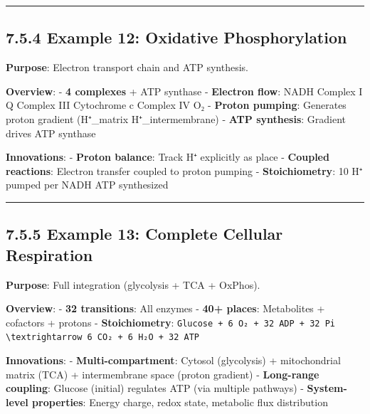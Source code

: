 \begin{center}\rule{0.5\linewidth}{0.5pt}\end{center}

\hypertarget{example-12-oxidative-phosphorylation}{%
\subsection{7.5.4 Example 12: Oxidative
Phosphorylation}\label{example-12-oxidative-phosphorylation}}

\textbf{Purpose}: Electron transport chain and ATP synthesis.

\textbf{Overview}: - \textbf{4 complexes} + ATP synthase -
\textbf{Electron flow}: NADH \textrightarrow Complex I \textrightarrow Q \textrightarrow Complex III \textrightarrow Cytochrome
c \textrightarrow Complex IV \textrightarrow O₂ - \textbf{Proton pumping}: Generates proton gradient
(H⁺\_matrix \textrightarrow H⁺\_intermembrane) - \textbf{ATP synthesis}: Gradient
drives ATP synthase

\textbf{Innovations}: - \textbf{Proton balance}: Track H⁺ explicitly as
place - \textbf{Coupled reactions}: Electron transfer coupled to proton
pumping - \textbf{Stoichiometry}: 10 H⁺ pumped per NADH  ATP
synthesized

\begin{center}\rule{0.5\linewidth}{0.5pt}\end{center}

\hypertarget{example-13-complete-cellular-respiration}{%
\subsection{7.5.5 Example 13: Complete Cellular
Respiration}\label{example-13-complete-cellular-respiration}}

\textbf{Purpose}: Full integration (glycolysis + TCA + OxPhos).

\textbf{Overview}: - \textbf{32 transitions}: All enzymes - \textbf{40+
places}: Metabolites + cofactors + protons - \textbf{Stoichiometry}:
\passthrough{\lstinline!Glucose + 6 O₂ + 32 ADP + 32 Pi \textrightarrow 6 CO₂ + 6 H₂O + 32 ATP!}

\textbf{Innovations}: - \textbf{Multi-compartment}: Cytosol (glycolysis)
+ mitochondrial matrix (TCA) + intermembrane space (proton gradient) -
\textbf{Long-range coupling}: Glucose (initial) regulates ATP (via
multiple pathways) - \textbf{System-level properties}: Energy charge,
redox state, metabolic flux distribution

